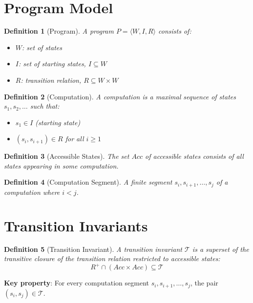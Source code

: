 \documentclass{article}
\newtheorem{definition}{Definition}
\begin{document}
\section{Program Model}

\begin{definition}[Program]
A program $P = \langle W, I, R \rangle$ consists of:
\begin{itemize}
    \item $W$: set of states
    \item $I$: set of starting states, $I \subseteq W$
    \item $R$: transition relation, $R \subseteq W \times W$
\end{itemize}
\end{definition}

\begin{definition}[Computation]
A computation is a maximal sequence of states $s_1, s_2, \ldots$ such that:
\begin{itemize}
    \item $s_1 \in I$ (starting state)
    \item $(s_i, s_{i+1}) \in R$ for all $i \geq 1$
\end{itemize}
\end{definition}

\begin{definition}[Accessible States]
The set $Acc$ of accessible states consists of all states appearing in some computation.
\end{definition}

\begin{definition}[Computation Segment]
A finite segment $s_i, s_{i+1}, \ldots, s_j$ of a computation where $i < j$.
\end{definition}

\section{Transition Invariants}

\begin{definition}[Transition Invariant]
A transition invariant $\mathcal{T}$ is a superset of the transitive closure of the transition relation restricted to accessible states:
\begin{equation}
R^+ \cap (Acc \times Acc) \subseteq \mathcal{T}
\end{equation}
\end{definition}

\textbf{Key property}: For every computation segment $s_i, s_{i+1}, \ldots, s_j$, the pair $(s_i, s_j) \in \mathcal{T}$.
\end{document}

